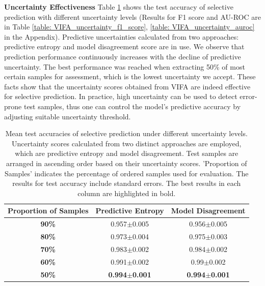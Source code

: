 \documentclass[10pt]{article} %
\begin{document}
\textbf{Uncertainty Effectiveness} Table \ref{table: VIFA_uncertainty_acc} shows the test accuracy of selective prediction with different uncertainty levels (Results for F1 score and AU-ROC are in Table \ref{table: VIFA_uncertainty_f1_score}, \ref{table: VIFA_uncertainty_auroc} in the Appendix). Predictive uncertainties calculated from two approaches: predictive entropy and model disagreement score are in use. We observe that prediction performance continuously increases with the decline of predictive uncertainty. The best performance was reached when extracting 50\% of most certain samples for assessment, which is the lowest uncertainty we accept. These facts show that the uncertainty scores obtained from VIFA are indeed effective for selective prediction. In practice, high uncertainty can be used to detect error-prone test samples, thus one can control the model's predictive accuracy by adjusting suitable uncertainty threshold. 


\begin{table}[!htp]
\caption{Mean test accuracies of selective prediction under different uncertainty levels. Uncertainty scores calculated from two distinct approaches are employed, which are predictive entropy and model disagreement. Test samples are arranged in ascending order based on their uncertainty scores. 'Proportion of Samples' indicates the percentage of ordered samples used for evaluation. The results for test accuracy include standard errors. The best results in each column are highlighted in bold.}
\label{table: VIFA_uncertainty_acc}
\begin{center}
\begin{tabular}{c|c|c}
\textbf{Proportion of Samples} & \textbf{Predictive Entropy} & \textbf{Model Disagreement} \\ \hline
\textbf{90\%}                               & 0.957$\pm$0.005                 & 0.956$\pm$0.005                 \\
\textbf{80\%}                               & 0.973$\pm$0.004                 & 0.975$\pm$0.003                 \\
\textbf{70\%}                               & 0.983$\pm$0.002                 & 0.984$\pm$0.002                 \\
\textbf{60\%}                               & 0.991$\pm$0.002                 & 0.99$\pm$0.002                  \\
\textbf{50\%}                               & \textbf{0.994$\pm$0.001}                 & \textbf{0.994$\pm$0.001}        
\end{tabular}
\end{center}
\end{table}
\end{document}
